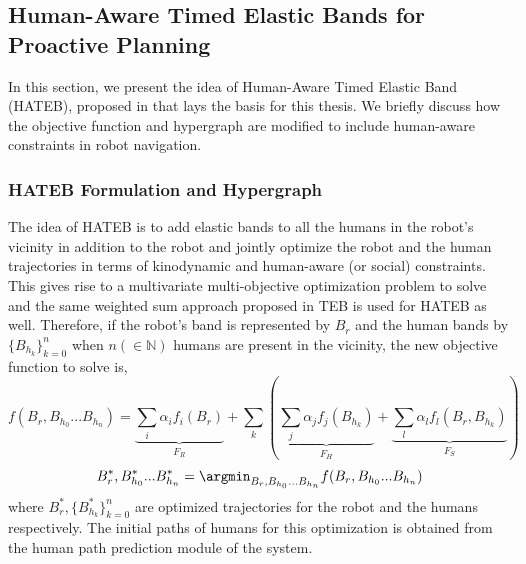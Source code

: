 \subsection{Human-Aware Timed Elastic Bands for Proactive Planning}
In this section, we present the idea of Human-Aware Timed Elastic Band (HATEB), proposed in \cite{khambhaita2017viewing} that lays the basis for this thesis. We briefly discuss how the objective function and hypergraph are modified to include human-aware constraints in robot navigation. 
\subsubsection{HATEB Formulation and Hypergraph}
The idea of HATEB is to add elastic bands to all the humans in the robot's vicinity in addition to the robot and jointly optimize the robot and the human trajectories in terms of kinodynamic and human-aware (or social) constraints. This gives rise to a multivariate multi-objective optimization problem to solve and the same weighted sum approach proposed in TEB is used for HATEB as well. Therefore, if the robot's band is represented by $B_r$ and the human bands by $\{B_{h_k}\}_{k=0}^n$ when $n (\in \mathbb{N})$ humans are present in the vicinity, the new objective function to solve is,
\begin{equation}
    \label{hateb_eq}
    f(B_r, B_{h_0}...B_{h_n}) = \underbrace{\sum_{i}\alpha_i f_i(B_r)}_{F_R} + \sum_k \left (\underbrace{\sum_{j}\alpha_j f_j(B_{h_k})}_{F_H} + \underbrace{\sum_l \alpha_l f_l(B_r, B_{h_k})}_{F_S} \right )
\end{equation}
\begin{equation}
    B_r^*, B_{h_0}^*...B_{h_n}^* = \argmin_{B_r, B_{h_0}...B_{h_n}} f(B_r, B_{h_0}...B_{h_n})
\end{equation}
where $B_r^*, \{B_{h_k}^*\}_{k=0}^n$ are optimized trajectories for the robot and the humans respectively. The initial paths of humans for this optimization is obtained from the human path prediction module of the system.
